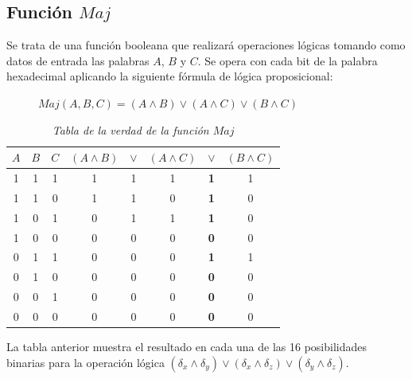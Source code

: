 \documentclass{article}
\begin{document}
    \subsection{Función $Maj$}
        Se trata de una función booleana que realizará operaciones lógicas tomando como datos de entrada las palabras $A$, $B$ y $C$. Se opera con cada bit de la palabra hexadecimal aplicando la siguiente fórmula de lógica proposicional:
            \begin{figure}[H]
            \centering
                $Maj(A, B, C) = (A \land B) \lor (A \land C) \lor ( B \land C)$
            \end{figure}
            \begin{table}[H]
            \centering
            \begin{tabular}{| c c c | c c c c c |} 
                \hline
                $A$ & $B$ & $C$ & $(A \land B)$ & $\lor$ & $(A \land C)$ & $\lor$ & $( B \land C)$ \\
                \hline
                1 & 1 & 1 & 1 & 1 & 1 & \textbf1 & 1 \\
                1 & 1 & 0 & 1 & 1 & 0 & \textbf1 & 0 \\
                1 & 0 & 1 & 0 & 1 & 1 & \textbf1 & 0 \\
                1 & 0 & 0 & 0 & 0 & 0 & \textbf0 & 0 \\
                0 & 1 & 1 & 0 & 0 & 0 & \textbf1 & 1 \\
                0 & 1 & 0 & 0 & 0 & 0 & \textbf0 & 0 \\
                0 & 0 & 1 & 0 & 0 & 0 & \textbf0 & 0 \\
                0 & 0 & 0 & 0 & 0 & 0 & \textbf0 & 0 \\
                \hline
            \end{tabular}
            \caption{\textit{Tabla de la verdad de la función $Maj$}}
            \label{table:2}
            \end{table}
        La tabla anterior muestra el resultado en cada una de las 16 posibilidades binarias para la operación lógica $(\delta_{x} \land \delta_{y}) \lor (\delta_{x} \land \delta_{z}) \lor (\delta_{y} \land \delta_{z})$.
        
\end{document}
